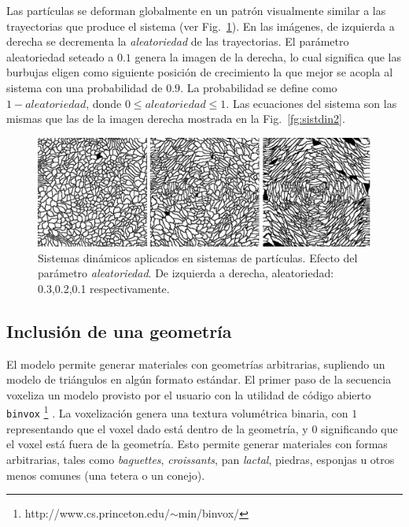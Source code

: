 Las part\'iculas se deforman globalmente en un patr\'on visualmente similar a las trayectorias que produce el sistema (ver Fig.~\ref{fg:sistdin3}).
En las im\'agenes, de izquierda a derecha se decrementa la {\em aleatoriedad} de las trayectorias.
El par\'ametro aleatoriedad seteado a $0.1$ genera la imagen de la derecha, lo cual significa que las burbujas eligen como siguiente posición de crecimiento la que mejor se acopla al sistema con una probabilidad de $0.9$.
La probabilidad se define como $1-aleatoriedad$, donde $0 \leq aleatoriedad \leq 1$.
Las ecuaciones del sistema son las mismas que las de la imagen derecha mostrada en la Fig.~\ref{fg:sistdin2}.

\begin{figure}[htb!]
  \centerline{\includegraphics[width=13cm]{figures/Fig3}}
  \caption[Sistemas din\'amicos aplicados en sistemas de part\'iculas]{Sistemas din\'amicos aplicados en sistemas de part\'iculas. Efecto del parámetro {\em aleatoriedad}. De izquierda a derecha, aleatoriedad: 0.3,0.2,0.1 respectivamente. }
  \label{fg:sistdin3}
\end{figure}



\subsection{Inclusión de una geometría}

El modelo permite generar materiales con geometrías arbitrarias, supliendo un modelo de triángulos en algún formato estándar.
El primer paso de la secuencia voxeliza un modelo provisto por el usuario con la utilidad de código abierto {\tt binvox} \footnote{http://www.cs.princeton.edu/$\sim$min/binvox/} \cite{Nooruddin2003}.
La voxelización genera una textura volumétrica binaria, con $1$ representando que el voxel dado está dentro de la geometría, y $0$ significando que el voxel está fuera de la geometría.
Esto permite generar materiales con formas arbitrarias, tales como {\em baguettes}, {\em croissants}, pan {\em lactal}, piedras, esponjas u otros menos comunes (una tetera o un conejo).

